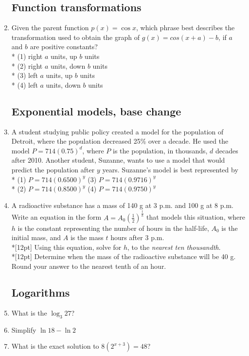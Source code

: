 \documentclass[12pt, oneside]{article}
\begin{document}
\begin{enumerate}
\subsection*{Function transformations}
\item Given the parent function $p(x) = \cos x$, which phrase best describes the transformation used to obtain the graph of $g(x)=cos(x+a)-b$, if $a$ and $b$ are positive constants?\\*
(1) right $a$ units, up $b$ units\\*
(2) right $a$ units, down $b$ units\\*
(3) left $a$ units, up $b$ units\\*
(4) left $a$ units, down $b$ units

\subsection*{Exponential models, base change}
\item A student studying public policy created a model for the population of Detroit, where the population decreased 25\% over a decade. He used the model $P=714(0.75)^d$, where $P$ is the population, in thousands, $d$ decades after 2010. Another student, Suzanne, wants to use a model that would predict the population after $y$ years. Suzanne’s model is best represented by\\*
(1) $P=714(0.6500)^y$ (3) $P=714(0.9716)^y$\\* 
(2) $P=714(0.8500)^y$ (4) $P=714(0.9750)^y$

\item A radioactive substance has a mass of 140 g at 3 p.m. and 100 g at 8 p.m. Write an equation in the form $\displaystyle A=A_0\left(\frac{1}{2}\right)^{\frac{t}{h}}$ that models this situation, where $h$ is the constant representing the number of hours in the half-life, $A_0$ is the initial mass, and $A$ is the mass $t$ hours after 3 p.m.\\*[12pt]
Using this equation, solve for $h$, to the \textit{nearest ten thousandth}.\\*[12pt]
Determine when the mass of the radioactive substance will be 40 g. Round your answer to the nearest tenth of an hour.
   

\subsection*{Logarithms}
\item What is the $\log_3{27}$?
\item Simplify $\ln{18}-\ln{2}$
\item What is the exact solution to $8(2^{x + 3}) = 48$?


\end{enumerate}
\end{document}
